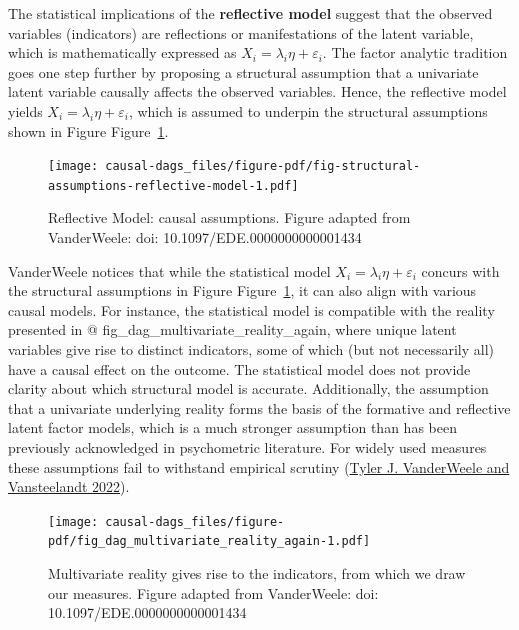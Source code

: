 \documentclass[
  singlecolumn]{report}
\begin{document}
The statistical implications of the \textbf{reflective model} suggest
that the observed variables (indicators) are reflections or
manifestations of the latent variable, which is mathematically expressed
as \(X_i = \lambda_i \eta + \varepsilon_i\). The factor analytic
tradition goes one step further by proposing a structural assumption
that a univariate latent variable causally affects the observed
variables. Hence, the reflective model yields
\(X_i = \lambda_i \eta + \varepsilon_i\), which is assumed to underpin
the structural assumptions shown in Figure
Figure~\ref{fig-structural-assumptions-reflective-model}.

\begin{figure}

{\centering \texttt{[image: causal-dags\_files/figure-pdf/fig-structural-assumptions-reflective-model-1.pdf]}

}

\caption{\label{fig-structural-assumptions-reflective-model}Reflective
Model: causal assumptions. Figure adapted from VanderWeele: doi:
10.1097/EDE.0000000000001434}

\end{figure}

VanderWeele notices that while the statistical model
\(X_i = \lambda_i \eta + \varepsilon_i\) concurs with the structural
assumptions in Figure
Figure~\ref{fig-structural-assumptions-reflective-model}, it can also
align with various causal models. For instance, the statistical model is
compatible with the reality presented in @
fig\_dag\_multivariate\_reality\_again, where unique latent variables
give rise to distinct indicators, some of which (but not necessarily
all) have a causal effect on the outcome. The statistical model does not
provide clarity about which structural model is accurate. Additionally,
the assumption that a univariate underlying reality forms the basis of
the formative and reflective latent factor models, which is a much
stronger assumption than has been previously acknowledged in
psychometric literature. For widely used measures these assumptions fail
to withstand empirical scrutiny
(\protect\hyperlink{ref-vanderweele2022b}{Tyler J. VanderWeele and
Vansteelandt 2022}).

\begin{figure}

{\centering \texttt{[image: causal-dags\_files/figure-pdf/fig\_dag\_multivariate\_reality\_again-1.pdf]}

}

\caption{Multivariate reality gives rise to the indicators, from which
we draw our measures. Figure adapted from VanderWeele: doi:
10.1097/EDE.0000000000001434}

\end{figure}
\end{document}
